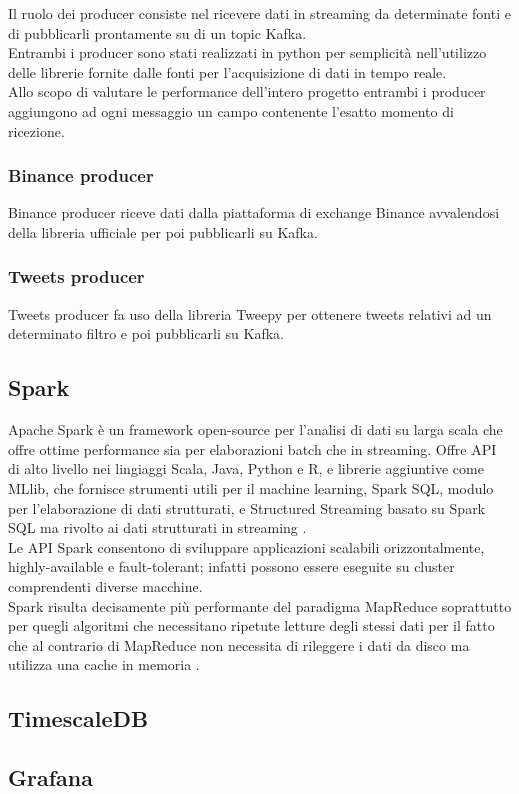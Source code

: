 Il ruolo dei producer consiste nel ricevere dati in streaming da determinate fonti e di
pubblicarli prontamente su di un topic Kafka.
\\
Entrambi i producer sono stati realizzati in python per semplicità nell'utilizzo delle
librerie fornite dalle fonti per l'acquisizione di dati in tempo reale.
\\
Allo scopo di valutare le performance dell'intero progetto entrambi i producer aggiungono
ad ogni messaggio un campo contenente l'esatto momento di ricezione.

\subsubsection{Binance producer}

Binance producer riceve dati dalla piattaforma di exchange Binance \cite{binance}
avvalendosi della libreria ufficiale per poi pubblicarli su Kafka.

\subsubsection{Tweets producer}

Tweets producer fa uso della libreria Tweepy \cite{tweepy} per ottenere tweets relativi
ad un determinato filtro e poi pubblicarli su Kafka.

\subsection{Spark}

Apache Spark è un framework open-source per l'analisi di dati su larga scala che offre ottime
performance sia per elaborazioni batch che in streaming. Offre API di alto livello nei lingiaggi
Scala, Java, Python e R, e librerie aggiuntive come MLlib, che fornisce strumenti utili per il
machine learning, Spark SQL, modulo per l'elaborazione di dati strutturati,
e Structured Streaming basato su Spark SQL ma rivolto ai dati strutturati in streaming \cite{spark}.
\\
Le API Spark consentono di sviluppare applicazioni scalabili orizzontalmente, highly-available
e fault-tolerant; infatti possono
essere eseguite su cluster comprendenti diverse macchine.
\\
Spark risulta decisamente più performante del paradigma MapReduce soprattutto per quegli algoritmi
che necessitano ripetute letture degli stessi dati per il fatto che al contrario di MapReduce non
necessita di rileggere i dati da disco ma utilizza una cache in memoria \cite{spark_mapred}.

\subsection{TimescaleDB}

\subsection{Grafana}
